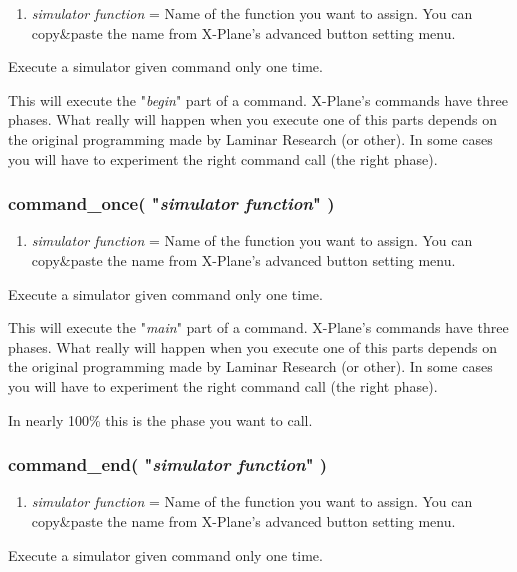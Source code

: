 \documentclass[11pt,parskip=half,a4paper]{scrartcl}
\begin{document}
\begin{enumerate}
	\item \emph{simulator function} = Name of the function you want to assign. You can copy\&paste the name from X-Plane's advanced button setting menu.
\end{enumerate}

Execute a simulator given command only one time.

This will execute the "\emph{begin}" part of a command. X-Plane's commands have three phases. What really will happen when you execute one of this parts depends on the original programming made by Laminar Research  (or other). In some cases you will have to experiment the right command call (the right phase).

\subsubsection{command\_once( "\emph{simulator function}" )}

\begin{enumerate}
	\item \emph{simulator function} = Name of the function you want to assign. You can copy\&paste the name from X-Plane's advanced button setting menu.
\end{enumerate}

Execute a simulator given command only one time.

This will execute the "\emph{main}" part of a command. X-Plane's commands have three phases. What really will happen when you execute one of this parts depends on the original programming made by Laminar Research  (or other). In some cases you will have to experiment the right command call (the right phase).

In nearly 100\% this is the phase you want to call.

\subsubsection{command\_end( "\emph{simulator function}" )}

\begin{enumerate}
	\item \emph{simulator function} = Name of the function you want to assign. You can copy\&paste the name from X-Plane's advanced button setting menu.
\end{enumerate}

Execute a simulator given command only one time.
\end{document}
